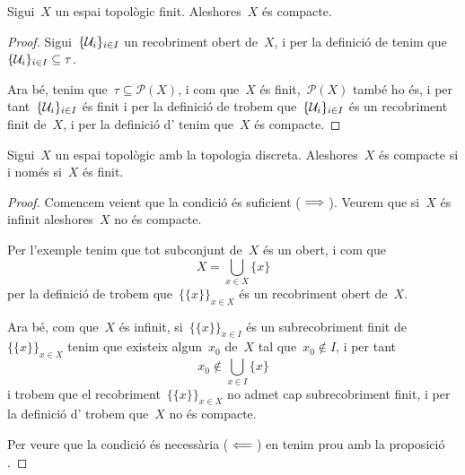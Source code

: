 \documentclass[../../main.tex]{subfiles}
\begin{document}
    \begin{proposition}
        \label{prop:un espai topològic finit és compacte}
        Sigui~\(X\) un espai topològic finit.
        Aleshores~\(X\) és compacte.
        \begin{proof}
            Sigui~\(\{\mathcal{U}_{i}\}_{i\in I}\) un recobriment obert de~\(X\), i per la definició de  tenim que~\(\{\mathcal{U}_{i}\}_{i\in I}\subseteq\tau\).

            Ara bé, tenim que~\(\tau\subseteq\mathcal{P}(X)\), i com que~\(X\) és finit,~\(\mathcal{P}(X)\) també ho és, i per tant~\(\{\mathcal{U}_{i}\}_{i\in I}\) és finit i per la definició de  trobem que~\(\{\mathcal{U}_{i}\}_{i\in I}\) és un recobriment finit de~\(X\), i per la definició d' tenim que~\(X\) és compacte.
        \end{proof}
    \end{proposition}
    \begin{proposition}
        \label{prop:un espai topològic discret és compacte si i només si és finit}
        Sigui~\(X\) un espai topològic amb la topologia discreta.
        Aleshores~\(X\) és compacte si i només si~\(X\) és finit.
        \begin{proof}
            Comencem veient que la condició és suficient (\(\implies\)).
            Veurem que si~\(X\) és infinit aleshores~\(X\) no és compacte.

            Per l'exemple  tenim que tot subconjunt de~\(X\) és un obert, i com que
            \[
                X=\bigcup_{x\in X}\{x\}
            \]
            per la definició de  trobem que~\(\{\{x\}\}_{x\in X}\) és un recobriment obert de~\(X\).

            Ara bé, com que~\(X\) és infinit, si~\(\{\{x\}\}_{x\in I}\) és un subrecobriment finit de~\(\{\{x\}\}_{x\in X}\) tenim que existeix algun~\(x_{0}\) de~\(X\) tal que~\(x_{0}\notin I\), i per tant
            \[
                x_{0}\notin\bigcup_{x\in I}\{x\}
            \]
            i trobem que el recobriment~\(\{\{x\}\}_{x\in X}\) no admet cap subrecobriment finit, i per la definició d' trobem que~\(X\) no és compacte.

            Per veure que la condició és necessària (\(\impliedby\)) en tenim prou amb la proposició .
        \end{proof}
    \end{proposition}
\end{document}
